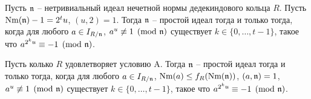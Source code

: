 \documentclass[_00_dissertation.tex]{subfiles}
\begin{document}
\begin{theorem}\label{theorem:miller_criteria}
    Пусть $\mathfrak{n}$ -- нетривиальный идеал нечетной нормы дедекиндового кольца $R$.
    Пусть $\textrm{Nm}(\mathfrak{n}) - 1 = 2^t u$, $(u, 2) = 1$.
    Тогда $\mathfrak{n}$ -- простой идеал тогда и только тогда, когда для любого $a \in I_{R/\mathfrak{n}}$, $a^u \not\equiv 1 \pmod{\mathfrak{n}}$ существует $k\in \{0, \dots, t-1\}$, такое что $a^{2^{k}u} \equiv -1 \pmod{\mathfrak{n}}$.

    Пусть колько $R$ удовлетворяет условию A.
    Тогда $\mathfrak{n}$ -- простой идеал тогда и только тогда, когда для любого $a \in I_{R/\mathfrak{n}}$, $\textrm{Nm}(a) \le f_R(\textrm{Nm}(\mathfrak{n}))$, $(a, \mathfrak{n}) = 1$, $a^u \not\equiv 1 \pmod{\mathfrak{n}}$ существует $k\in \{0, \dots, t-1\}$, такое что $a^{2^{k}u} \equiv -1 \pmod{\mathfrak{n}}$.
\end{theorem}
\end{document}
